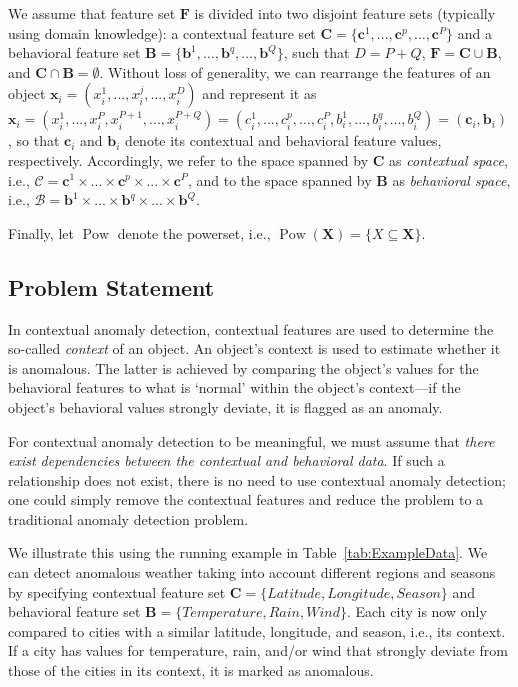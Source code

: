 \documentclass[pdflatex,sn-basic]{sn-jnl}%
\theoremstyle{thmstyleone}%
\DeclareMathOperator{\Pow}{Pow}
\theoremstyle{thmstyletwo}%
\theoremstyle{thmstylethree}%
\begin{document}
We assume that feature set $\mathbf{F}$ is divided into two disjoint feature sets (typically using domain knowledge): a contextual feature set $\mathbf{C} =\{\mathbf{c}^{1},...,\mathbf{c}^{p},\ldots,\mathbf{c}^{P}\}$ and a behavioral feature set $\mathbf{B} =\{\mathbf{b}^{1},\ldots,\mathbf{b}^{q},\ldots,\mathbf{b}^{Q}\}$, such that $D=P+Q$, $\mathbf{F} = \mathbf{C} \cup \mathbf{B}$, and $\mathbf{C} \cap \mathbf{B} = \emptyset$. Without loss of generality, we can rearrange the features of an object
$\mathbf{x}_{i}=(x_{i}^{1},...,x_{i}^{j},...,x_{i}^{D})$ and represent it as $\mathbf{x}_{i}=(x_{i}^{1},...,x_{i}^{P},x_{i}^{P+1},...,x_{i}^{P+Q}) = (c_{i}^{1},...,c_{i}^{p},...,c_{i}^{P},b_{i}^{1},...,b_{i}^{q},...,b_{i}^{Q})=(\mathbf{c}_{i}, \mathbf{b}_{i}) $, so that $\mathbf{c}_{i}$ and $\mathbf{b}_{i}$ denote its contextual and behavioral feature values, respectively. Accordingly, we refer to the space spanned by $\mathbf{C}$ as \textit{contextual space}, i.e., $\mathcal{C} = \mathbf{c}^{1}\times... \times\mathbf{c}^{p}\times...\times\mathbf{c}^{P}$, and to the space spanned by $\mathbf{B}$ as \textit{behavioral space}, i.e., $\mathcal{B} = \mathbf{b}^{1}\times...\times \mathbf{b}^{q}\times...\times\mathbf{b}^{Q}$.

Finally, let $\Pow$ denote the powerset, i.e., $\Pow(\mathbf{X}) = \{X \subseteq \mathbf{X}\}$.

\subsection{Problem Statement}

In contextual anomaly detection, contextual features are used to determine the so-called \emph{context} of an object. An object's context is used to estimate whether it is anomalous. The latter is achieved by comparing the object's values for the behavioral features to what is `normal' within the object's context---if the object's behavioral values strongly deviate, it is flagged as an anomaly.

For contextual anomaly detection to be meaningful, we must assume that \emph{there exist dependencies between the contextual and behavioral data}. If such a relationship does not exist, there is no need to use contextual anomaly detection; one could simply remove the contextual features and reduce the problem to a traditional anomaly detection problem.

We illustrate this using the running example in Table~\ref{tab:ExampleData}. We can detect anomalous weather taking into account different regions and seasons by specifying contextual feature set $\mathbf{C} = \{Latitude, Longitude, Season\}$ and behavioral feature set  $\mathbf{B} = \{Temperature, Rain, Wind\}$. Each city is now only compared to cities with a similar latitude, longitude, and season, i.e., its context. If a city has values for temperature, rain, and/or wind that strongly deviate from those of the cities in its context, it is marked as anomalous.
\end{document}
